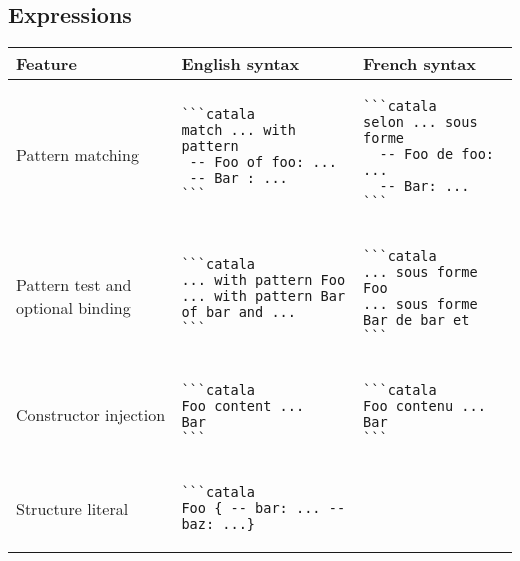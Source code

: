 \documentclass[a3paper,landscape]{article}
\begin{document}
\begin{multicols*}{2}
\section*{Expressions}
\begin{center}
\begin{tabular}{p{}p{}p{}}
\toprule
Feature&English syntax&French syntax\\\midrule
Pattern matching&
\vspace*{-1.75em}
\begin{verbatim}
```catala
match ... with pattern
 -- Foo of foo: ...
 -- Bar : ...
```
\end{verbatim}
\vspace*{-1.75em}
&
\vspace*{-1.75em}
\begin{verbatim}
```catala
selon ... sous forme
  -- Foo de foo: ...
  -- Bar: ...
```
\end{verbatim}
\vspace*{-1.75em}
\\
Pattern test and optional binding&
\vspace*{-1.75em}
\begin{verbatim}
```catala
... with pattern Foo
... with pattern Bar of bar and ...
```
\end{verbatim}
\vspace*{-1.75em}
&
\vspace*{-1.75em}
\begin{verbatim}
```catala
... sous forme Foo
... sous forme Bar de bar et
```
\end{verbatim}
\vspace*{-1.75em}
\\
Constructor injection&
\vspace*{-1.75em}
\begin{verbatim}
```catala
Foo content ...       Bar
```
\end{verbatim}
\vspace*{-1.75em}
&
\vspace*{-1.75em}
\begin{verbatim}
```catala
Foo contenu ...       Bar
```
\end{verbatim}
\vspace*{-1.75em}
\\
Structure literal&
\vspace*{-1.75em}
\begin{verbatim}
```catala
Foo { -- bar: ... -- baz: ...}

\end{verbatim}
\end{tabular}
\end{center}
\end{multicols*}
\end{document}
